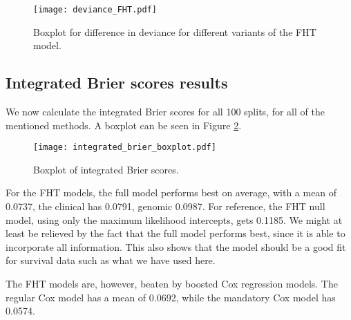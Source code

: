 \begin{figure}
\caption{Boxplot for difference in deviance for different variants of the FHT model.}
\label{fig:neuroblastoma-deviances}
\centering
\texttt{[image: deviance\_FHT.pdf]}
\end{figure}




\subsection{Integrated Brier scores results}
We now calculate the integrated Brier scores for all 100 splits, for all of the mentioned methods.
A boxplot can be seen in Figure \ref{fig:neuroblastoma-integrated-brier}.
\begin{figure}
\caption{Boxplot of integrated Brier scores.}
\label{fig:neuroblastoma-integrated-brier}
\centering
\texttt{[image: integrated\_brier\_boxplot.pdf]}
\end{figure}
For the FHT models, the full model performs best on average, with a mean of 0.0737, the clinical has 0.0791, genomic 0.0987.
For reference, the FHT null model, using only the maximum likelihood intercepts, gets 0.1185.
We might at least be relieved by the fact that the full model performs best, since it is able to incorporate all information.
This also shows that the model should be a good fit for survival data such as what we have used here.

The FHT models are, however, beaten by boosted Cox regression models.
The regular Cox model has a mean of 0.0692, while the mandatory Cox model has 0.0574.